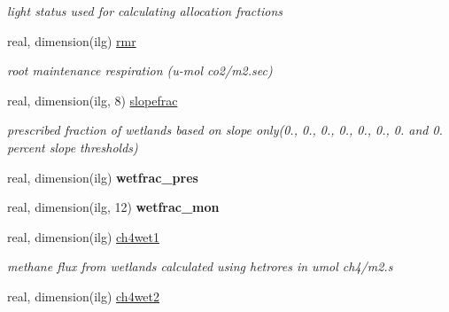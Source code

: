 \begin{DoxyCompactItemize}
\begin{DoxyCompactList}\small\item\em light status used for calculating allocation fractions \end{DoxyCompactList}\item 
\hypertarget{structctem__statevars_1_1veg__gat_a89a5ae93075993071b4e6355ee747113}{}real, dimension(ilg) \hyperlink{structctem__statevars_1_1veg__gat_a89a5ae93075993071b4e6355ee747113}{rmr}\label{structctem__statevars_1_1veg__gat_a89a5ae93075993071b4e6355ee747113}

\begin{DoxyCompactList}\small\item\em root maintenance respiration (u-\/mol co2/m2.\+sec) \end{DoxyCompactList}\item 
\hypertarget{structctem__statevars_1_1veg__gat_a8c196dc5ab22d8c509ffe74ff3ffacfc}{}real, dimension(ilg, 8) \hyperlink{structctem__statevars_1_1veg__gat_a8c196dc5ab22d8c509ffe74ff3ffacfc}{slopefrac}\label{structctem__statevars_1_1veg__gat_a8c196dc5ab22d8c509ffe74ff3ffacfc}

\begin{DoxyCompactList}\small\item\em prescribed fraction of wetlands based on slope only(0., 0., 0., 0., 0., 0., 0. and 0. percent slope thresholds) \end{DoxyCompactList}\item 
\hypertarget{structctem__statevars_1_1veg__gat_ac34591586518a7c756091853334556fa}{}real, dimension(ilg) {\bfseries wetfrac\+\_\+pres}\label{structctem__statevars_1_1veg__gat_ac34591586518a7c756091853334556fa}

\item 
\hypertarget{structctem__statevars_1_1veg__gat_a15b4844826c84c1a8a891714bf445315}{}real, dimension(ilg, 12) {\bfseries wetfrac\+\_\+mon}\label{structctem__statevars_1_1veg__gat_a15b4844826c84c1a8a891714bf445315}

\item 
\hypertarget{structctem__statevars_1_1veg__gat_a59ceb66171b2f59b47c93a24df019f15}{}real, dimension(ilg) \hyperlink{structctem__statevars_1_1veg__gat_a59ceb66171b2f59b47c93a24df019f15}{ch4wet1}\label{structctem__statevars_1_1veg__gat_a59ceb66171b2f59b47c93a24df019f15}

\begin{DoxyCompactList}\small\item\em methane flux from wetlands calculated using hetrores in umol ch4/m2.\+s \end{DoxyCompactList}\item 
\hypertarget{structctem__statevars_1_1veg__gat_a8c0389ed34f7671f3b977d216aaede72}{}real, dimension(ilg) \hyperlink{structctem__statevars_1_1veg__gat_a8c0389ed34f7671f3b977d216aaede72}{ch4wet2}\label{structctem__statevars_1_1veg__gat_a8c0389ed34f7671f3b977d216aaede72}


\end{DoxyCompactItemize}
